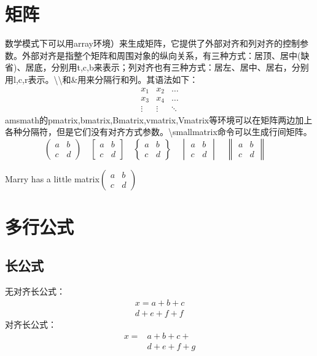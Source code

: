 \documentclass[UTF8]{article}
\begin{document}
\section{矩阵}
数学模式下可以用array环境）来生成矩阵，它提供了外部对齐和列对齐的控制参数。外部对齐是指整个矩阵和周围对象的纵向关系，有三种方式：居顶、居中(缺省)、居底，分别用t,c,b来表示；列对齐也有三种方式：居左、居中、居右，分别用l,c,r表示。\textbackslash \textbackslash 和\&用来分隔行和列。其语法如下：
\[
\begin{array}{ccc}
x_1 & x_2 & \dots \\
x_3 & x_4 & \dots \\
\vdots & \vdots & \ddots
\end{array}
\]
amsmath的pmatrix,bmatrix,Bmatrix,vmatrix,Vmatrix等环境可以在矩阵两边加上各种分隔符，但是它们没有对齐方式参数。\textbackslash smallmatrix命令可以生成行间矩阵。
\[
\begin{pmatrix}a&b\\c&d \end{pmatrix} \quad
\begin{bmatrix}a&b\\c&d \end{bmatrix} \quad
\begin{Bmatrix}a&b\\c&d \end{Bmatrix} \quad
\begin{vmatrix}a&b\\c&d \end{vmatrix} \quad
\begin{Vmatrix}a&b\\c&d \end{Vmatrix} \quad
\]

Marry has a little matrix$(\begin{smallmatrix}a&b\\c&d\end{smallmatrix})$

\section{多行公式}
\subsection{长公式}
无对齐长公式：\begin{multline}
	x = a+b+c{}\\
	d+e+f+f
\end{multline}
对齐长公式：\[\begin{split}
	x={}&a+b+c+{}\\
	&d+e+f+g
\end{split}\]
\end{document}
